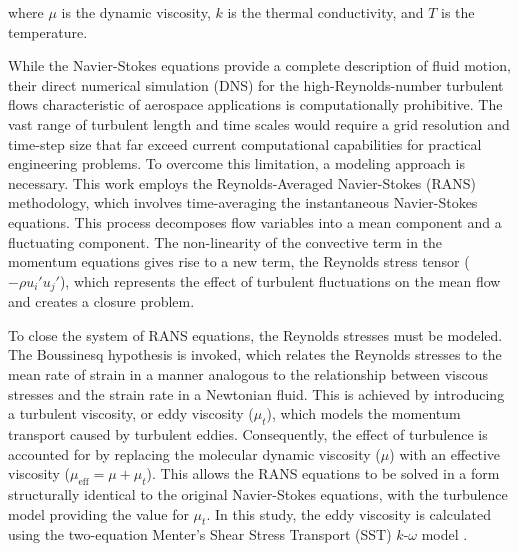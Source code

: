 \documentclass[tg, EN]{ufabcFHZh_tg}
\begin{document}
where $\mu$ is the dynamic viscosity, $k$ is the thermal conductivity, and $T$ is the temperature.

While the Navier-Stokes equations provide a complete description of fluid motion, their direct numerical simulation (DNS) for the high-Reynolds-number turbulent flows characteristic of aerospace applications is computationally prohibitive. The vast range of turbulent length and time scales would require a grid resolution and time-step size that far exceed current computational capabilities for practical engineering problems. To overcome this limitation, a modeling approach is necessary. This work employs the Reynolds-Averaged Navier-Stokes (RANS) methodology, which involves time-averaging the instantaneous Navier-Stokes equations. This process decomposes flow variables into a mean component and a fluctuating component. The non-linearity of the convective term in the momentum equations gives rise to a new term, the Reynolds stress tensor ($-\rho u_i' u_j'$), which represents the effect of turbulent fluctuations on the mean flow and creates a closure problem.

To close the system of RANS equations, the Reynolds stresses must be modeled. The Boussinesq hypothesis is invoked, which relates the Reynolds stresses to the mean rate of strain in a manner analogous to the relationship between viscous stresses and the strain rate in a Newtonian fluid. This is achieved by introducing a turbulent viscosity, or eddy viscosity ($\mu_t$), which models the momentum transport caused by turbulent eddies. Consequently, the effect of turbulence is accounted for by replacing the molecular dynamic viscosity ($\mu$) with an effective viscosity ($\mu_{\text{eff}} = \mu + \mu_t$). This allows the RANS equations to be solved in a form structurally identical to the original Navier-Stokes equations, with the turbulence model providing the value for $\mu_t$. In this study, the eddy viscosity is calculated using the two-equation Menter's Shear Stress Transport (SST) $k$-$\omega$ model \citep{menter1994}.

\end{document}
